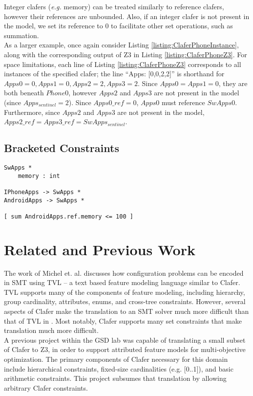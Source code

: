 \documentclass{article}
\newcommand{\eg}{\emph{e.g.}\xspace}
\begin{document}
\indent Integer clafers (\eg memory) can be treated similarly to reference clafers, however their references are unbounded. Also, if an integer clafer is not present in the model, we set its reference to 0 to facilitate other set operations, such as summation. \\
\indent As a larger example, once again consider Listing \ref{listing:ClaferPhoneInstance}, along with the corresponding output of Z3 in Listing \ref{listing:ClaferPhoneZ3}. For space limitations, each line of Listing \ref{listing:ClaferPhoneZ3} corresponds to all instances of the specified clafer; the line ``Apps: [0,0,2,2]'' is shorthand for $Apps0 = 0, Apps1 = 0, Apps2 = 2, Apps3 = 2$. Since $Apps0 = Apps1 = 0$, they are both beneath $Phone0$, however $Apps2$ and $Apps3$ are not present in the model (since $Apps_{sentinel} = 2$). Since $Apps0\_ref = 0$, $Apps0$ must reference $SwApps0$. Furthermore, since $Apps2$ and $Apps3$ are not present in the model, $Apps2\_ref = Apps3\_ref = SwApps_{sentinel}$.

\subsection{Bracketed Constraints}

\begin{lstlisting}[language=clafer, caption=A more complex mobile phone specification in clafer., label={listing:ClaferMoreComplexSpec}]
SwApps *
	memory : int

IPhoneApps -> SwApps *	
AndroidApps -> SwApps *

[ sum AndroidApps.ref.memory <= 100 ]	
\end{lstlisting}%

\section{Related and Previous Work}
The work of Michel et. al. \cite{Michel2012} discusses how configuration problems can be encoded in SMT using TVL \cite{Classen2011} -- a text based feature modeling language similar to Clafer. TVL supports many of the components of feature modeling, including hierarchy, group cardinality, attributes, enums, and cross-tree constraints. However, several aspects of Clafer make the translation to an SMT solver much more difficult than that of TVL in \cite{Michel2012}. Most notably, Clafer supports many set constraints that make translation much more difficult. \\
\indent  A previous project \cite{Olaechea2013} within the GSD lab was capable of translating a small subset of Clafer to Z3, in order to support attributed feature models for multi-objective optimization. The primary components of Clafer necessary for this domain include hierarchical constraints, fixed-size cardinalities (e.g. [0..1]), and basic arithmetic constraints. This project subsumes that translation by allowing arbitrary Clafer constraints.
\end{document}
